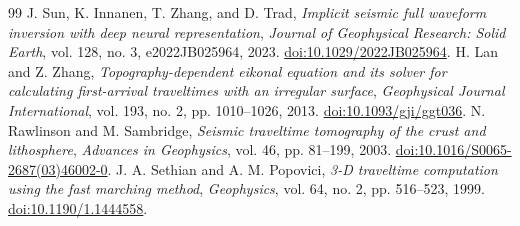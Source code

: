\documentclass[11pt]{article}
\begin{document}
\begin{thebibliography}{99}
 J. Sun, K. Innanen, T. Zhang, and D. Trad, \emph{Implicit seismic full waveform inversion with deep neural representation}, \emph{Journal of Geophysical Research: Solid Earth}, vol. 128, no. 3, e2022JB025964, 2023. \href{https://doi.org/10.1029/2022JB025964}{doi:10.1029/2022JB025964}.
 H. Lan and Z. Zhang, \emph{Topography-dependent eikonal equation and its solver for calculating first-arrival traveltimes with an irregular surface}, \emph{Geophysical Journal International}, vol. 193, no. 2, pp. 1010--1026, 2013. \href{https://doi.org/10.1093/gji/ggt036}{doi:10.1093/gji/ggt036}.
 N. Rawlinson and M. Sambridge, \emph{Seismic traveltime tomography of the crust and lithosphere}, \emph{Advances in Geophysics}, vol. 46, pp. 81--199, 2003. \href{https://doi.org/10.1016/S0065-2687(03)46002-0}{doi:10.1016/S0065-2687(03)46002-0}.
 J. A. Sethian and A. M. Popovici, \emph{3-D traveltime computation using the fast marching method}, \emph{Geophysics}, vol. 64, no. 2, pp. 516--523, 1999. \href{https://doi.org/10.1190/1.1444558}{doi:10.1190/1.1444558}.

\end{thebibliography}
\end{document}
